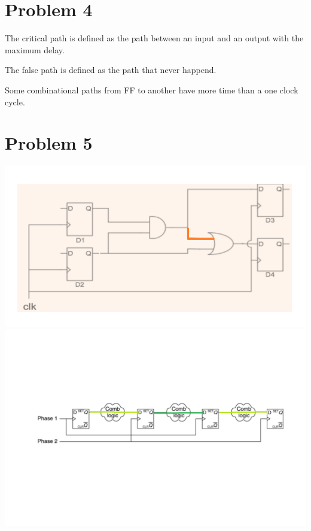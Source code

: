 \documentclass[paper=a4, fontsize=11pt]{scrartcl} %
\numberwithin{equation}{section} %
\numberwithin{figure}{section} %
\numberwithin{table}{section} %
\begin{document}

\section{Problem 4}
\par The critical path is defined as the path between an input and an output with the maximum delay.
\par The false path is defined as the path that never happend.
\par Some combinational paths from FF to another have more time than a one clock cycle.


\section{Problem 5}
\center\includegraphics[scale=0.5]{p5-1.png}\\
\center\includegraphics[scale=0.5]{p5-2.png}\\
\end{document}
